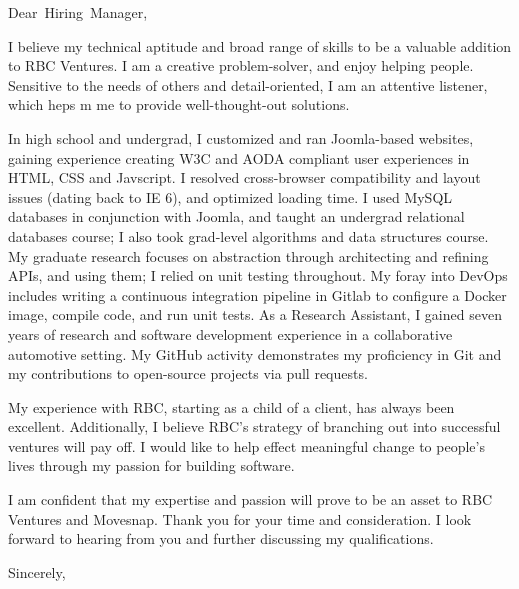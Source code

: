 \documentclass[
fontsize=12pt,
paper=letter,
parskip=half,
enlargefirstpage=on,    %
fromalign=right,        %
fromphone=on,           %
fromemail=on,
fromrule=aftername,     %
addrfield=off,           %
backaddress=off,         %
subject=beforeopening,  %
locfield=narrow,        %
foldmarks=off,           %
]{scrlttr2}
\renewcommand{\\}{\ {\large\textperiodcentered}\ }
\begin{document}

\begin{letter}{}


\opening{Dear~Hiring~Manager,}

I believe my technical aptitude and broad range of skills to be a valuable addition to RBC Ventures.
I am a creative problem-solver, and enjoy helping people.
Sensitive to the needs of others and detail-oriented, I am an attentive listener, which heps m me to provide well-thought-out solutions.

In high school and undergrad, I customized and ran Joomla-based websites, gaining experience creating W3C and AODA compliant user experiences in HTML, CSS and Javscript.
I resolved cross-browser compatibility and layout issues (dating back to IE 6), and optimized loading time.
I used MySQL databases in conjunction with Joomla, and taught an undergrad relational databases course; I also took grad-level algorithms and data structures course.
My graduate research focuses on abstraction through architecting and refining APIs, and using them; I relied on unit testing throughout.
My foray into DevOps includes writing a continuous integration pipeline in Gitlab to configure a Docker image, compile code, and run unit tests.
As a Research Assistant, I gained seven years of research and software development experience in a collaborative automotive setting.
My GitHub activity demonstrates my proficiency in Git and my contributions to open-source projects via pull requests.

My experience with RBC, starting as a child of a client, has always been excellent.
Additionally, I believe RBC's strategy of branching out into successful ventures will pay off.
I would like to help effect meaningful change to people's lives through my passion for building software.

I am confident that my expertise and passion will prove to be an asset to RBC Ventures and Movesnap.
Thank you for your time and consideration.
I look forward to hearing from you and further discussing my qualifications.
\closing{Sincerely,}


\end{letter}
\end{document}
